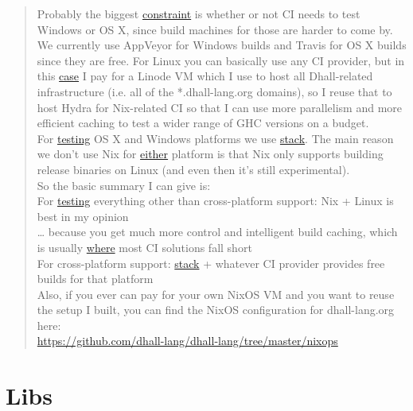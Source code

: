 \documentclass[a4paper,14pt,oneside]{book}
\begin{document}
\label{2020-02-29: Gabriel Gonzalez about the CIs for Haskell Opens Source projects}
\begin{quote}
Probably the biggest \hyperref[orgdcad00b]{constraint} is whether or not CI needs to test Windows or OS X, since build machines for those are harder to come by. We currently use AppVeyor for Windows builds and Travis for OS X builds since they are free. For Linux you can basically use any CI provider, but in this \hyperref[org6ef32e0]{case} I pay for a Linode VM which I use to host all Dhall-related infrastructure (i.e. all of the *.dhall-lang.org domains), so I reuse that to host Hydra for Nix-related CI so that I can use more parallelism and more efficient caching to test a wider range of GHC versions on a budget.\\

For \hyperref[org4941cb3]{testing} OS X and Windows platforms we use \hyperref[org019d668]{stack}. The main reason we don't use Nix for \hyperref[org53db2b1]{either} platform is that Nix only supports building release binaries on Linux (and even then it's still experimental).\\

So the basic summary I can give is:\\

For \hyperref[org4941cb3]{testing} everything other than cross-platform support: Nix + Linux is best in my opinion\\

\ldots{} because you get much more control and intelligent build caching, which is usually \hyperref[org350075b]{where} most CI solutions fall short\\

For cross-platform support: \hyperref[org019d668]{stack} + whatever CI provider provides free builds for that platform\\

Also, if you ever can pay for your own NixOS VM and you want to reuse the setup I built, you can find the NixOS configuration for dhall-lang.org here:\\

\url{https://github.com/dhall-lang/dhall-lang/tree/master/nixops}\\
\end{quote}


\part{Libs}
\label{sec:org471936a}
\end{document}
